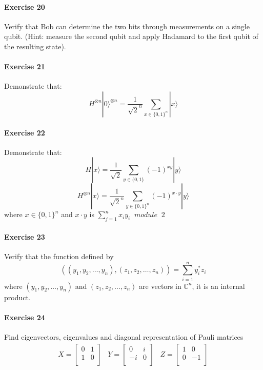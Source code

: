 \documentclass[a4paper,10pt]{article}
\begin{document}
\paragraph{Exercise 20}
\label{ex20q}
Verify that Bob can determine the two bits through measurements on a single qubit. (Hint: measure the second qubit and apply Hadamard to the first qubit of the resulting state).
\paragraph{Exercise 21}
\label{ex21q}
Demonstrate that:
$$H^{\otimes n} |0\rangle^{\otimes n} = \frac{1}{\sqrt{2}^n}\sum\limits_{x \in \{0, 1\}^{n}}|x\rangle$$
\paragraph{Exercise 22}
\label{ex22q}
Demonstrate that:
$$H|x\rangle = \frac{1}{\sqrt{2}}\sum\limits_{y \in \{0, 1\}}(-1)^{xy}|y\rangle$$
$$H^{\otimes n}|x\rangle = \frac{1}{\sqrt{2}^n}\sum\limits_{y \in \{0, 1\}^n}(-1)^{x \cdot y}|y\rangle$$
where $x \in \{0, 1\}^n$ and $x \cdot y$ is $\sum\limits_{j=1}^{n} x_iy_i \; \; module \; \; 2$
\paragraph{Exercise 23}
\label{ex23q}
Verify that the function defined by
$$((y_1, y_2, \ldots, y_n), (z_1, z_2, \ldots, z_n)) = \sum\limits_{i = 1}^{n}y_{i}^{*}z_i$$
where $(y_1, y_2, \ldots, y_n)$ and $(z_1, z_2, \ldots, z_n)$ are vectors in $\mathbb{C}^n$, it is an internal product.
\paragraph{Exercise 24}
\label{ex24q}
Find eigenvectors, eigenvalues and diagonal representation of Pauli matrices
\begin{equation*}
\begin{aligned}
X = \begin{bmatrix}
0 & 1 \\
1 & 0 \\
\end{bmatrix} \; \; \; 
Y = \begin{bmatrix}
0 & i \\
-i & 0 \\
\end{bmatrix} \; \; \;
Z = \begin{bmatrix}
1 & 0 \\
0 & -1 \\
\end{bmatrix}
\end{aligned}
\end{equation*}
\end{document}
